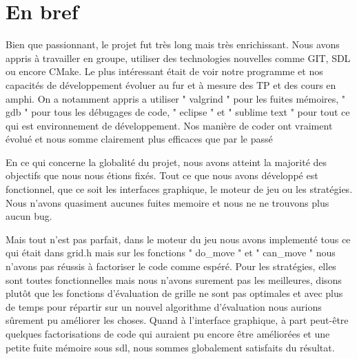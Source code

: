 \documentclass[12pt]{article}
\begin{document}
\section{En bref}
Bien que passionnant, le projet fut très long mais très enrichissant. Nous
avons appris à travailler en groupe, utiliser des technologies nouvelles comme
GIT, SDL ou encore CMake. Le plus intéressant était de voir notre programme et nos capacités
de développement évoluer au fur et à mesure des TP et des cours en amphi.
On a notamment appris a utiliser " valgrind " pour les fuites mémoires, " gdb " pour tous
les débugages de code, " eclipse " et " sublime text " pour
tout ce qui est environnement de développement. Nos manière de coder ont vraiment
évolué et nous somme clairement plus efficaces que par le passé
\par En ce qui concerne la globalité du projet, nous avons atteint la
majorité des objectifs que nous nous étions fixés. Tout ce que nous avons
développé est fonctionnel, que ce soit les interfaces graphique, le moteur
de jeu ou les stratégies. Nous n'avons quasiment aucunes fuites memoire et nous ne
ne trouvons plus aucun bug. 
\par Mais tout n'est pas parfait, dans le moteur du jeu
nous avons implementé tous ce qui était dans grid.h mais sur les fonctions
" do\_move " et " can\_move " nous n'avons pas réussis à
factoriser le code comme espéré. Pour les stratégies, elles sont toutes
fonctionnelles mais nous n'avons surement pas les meilleures, disons plutôt que les fonctions
d'évaluation de grille ne sont pas optimales et avec plus de temps pour répartir sur un nouvel
algorithme d'évaluation nous aurions sûrement pu améliorer les choses.
Quand à l'interface graphique, à part peut-être quelques factorisations de code qui auraient
pu encore être améliorées et une petite fuite mémoire sous sdl, nous sommes globalement satisfaits
du résultat.


\newpage



\newpage
\end{document}
